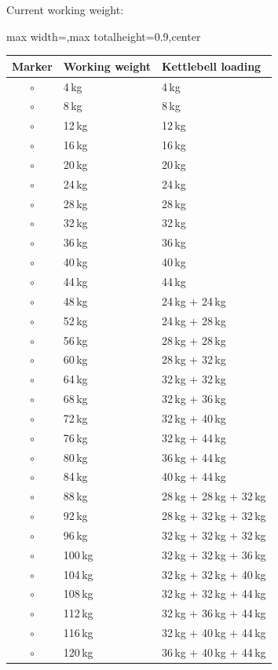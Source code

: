 \documentclass[11pt,a4paper]{article}
\newcommand{\tablearraystretch}{1.15}
\begin{document}
Current working weight:

\begin{center}
\renewcommand{\arraystretch}{\tablearraystretch}
\begin{adjustbox}{max width=\linewidth,max totalheight=0.9\textheight,center}
\begin{tabular}{cll}
\toprule
Marker & Working weight & Kettlebell loading \\
\midrule
$\circ$ & 4\,kg & 4\,kg \\
$\circ$ & 8\,kg & 8\,kg \\
$\circ$ & 12\,kg & 12\,kg \\
$\circ$ & 16\,kg & 16\,kg \\
$\circ$ & 20\,kg & 20\,kg \\
$\circ$ & 24\,kg & 24\,kg \\
$\circ$ & 28\,kg & 28\,kg \\
$\circ$ & 32\,kg & 32\,kg \\
$\circ$ & 36\,kg & 36\,kg \\
$\circ$ & 40\,kg & 40\,kg \\
$\circ$ & 44\,kg & 44\,kg \\
$\circ$ & 48\,kg & 24\,kg + 24\,kg \\
$\circ$ & 52\,kg & 24\,kg + 28\,kg \\
$\circ$ & 56\,kg & 28\,kg + 28\,kg \\
$\circ$ & 60\,kg & 28\,kg + 32\,kg \\
$\circ$ & 64\,kg & 32\,kg + 32\,kg \\
$\circ$ & 68\,kg & 32\,kg + 36\,kg \\
$\circ$ & 72\,kg & 32\,kg + 40\,kg \\
$\circ$ & 76\,kg & 32\,kg + 44\,kg \\
$\circ$ & 80\,kg & 36\,kg + 44\,kg \\
$\circ$ & 84\,kg & 40\,kg + 44\,kg \\
$\circ$ & 88\,kg & 28\,kg + 28\,kg + 32\,kg \\
$\circ$ & 92\,kg & 28\,kg + 32\,kg + 32\,kg \\
$\circ$ & 96\,kg & 32\,kg + 32\,kg + 32\,kg \\
$\circ$ & 100\,kg & 32\,kg + 32\,kg + 36\,kg \\
$\circ$ & 104\,kg & 32\,kg + 32\,kg + 40\,kg \\
$\circ$ & 108\,kg & 32\,kg + 32\,kg + 44\,kg \\
$\circ$ & 112\,kg & 32\,kg + 36\,kg + 44\,kg \\
$\circ$ & 116\,kg & 32\,kg + 40\,kg + 44\,kg \\
$\circ$ & 120\,kg & 36\,kg + 40\,kg + 44\,kg \\
\bottomrule
\end{tabular}
\end{adjustbox}
\renewcommand{\arraystretch}{1}
\end{center}
\end{document}

